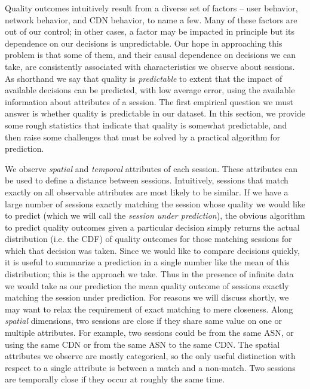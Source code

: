 Quality outcomes intuitively result from a diverse set of factors -- user behavior, network behavior, and CDN behavior, to name a few.  Many of these factors are out of our control; in other cases, a factor may be impacted in principle but its dependence on our decisions is unpredictable.  Our hope in approaching this problem is that some of them, and their causal dependence on decisions we can take, are consistently associated with characteristics we observe about sessions.  As shorthand we say that quality is {\it predictable} to extent that the impact of available decisions can be predicted, with low average error, using the available information about attributes of a session.  The first empirical question we must answer is whether quality is predictable in our dataset.  In this section, we provide some rough statistics that indicate that quality is somewhat predictable, and then raise some challenges that must be solved by a practical algorithm for prediction.

We observe {\it spatial} and {\it temporal} attributes of each session.  These attributes can be used to define a distance between sessions.  Intuitively, sessions that match exactly on all observable attributes are most likely to be similar.  If we have a large number of sessions exactly matching the session whose quality we would like to predict (which we will call the {\it session under prediction}), the obvious algorithm to predict quality outcomes given a particular decision simply returns the actual distribution (i.e. the CDF) of quality outcomes for those matching sessions for which that decision was taken.  Since we would like to compare decisions quickly, it is useful to summarize a prediction in a single number like the mean of this distribution; this is the approach we take.  Thus in the presence of infinite data we would take as our prediction the mean quality outcome of sessions exactly matching the session under prediction.  For reasons we will discuss shortly, we may want to relax the requirement of exact matching to mere closeness.  Along {\it spatial} dimensions, two sessions are close if they share same value on one or multiple attributes. For example, two sessions could be from the same ASN, or using the same CDN or from the same ASN to the same CDN. The spatial attributes we observe are mostly categorical, so the only useful distinction with respect to a single attribute is between a match and a non-match. Two sessions are temporally close if they occur at roughly the same time.

